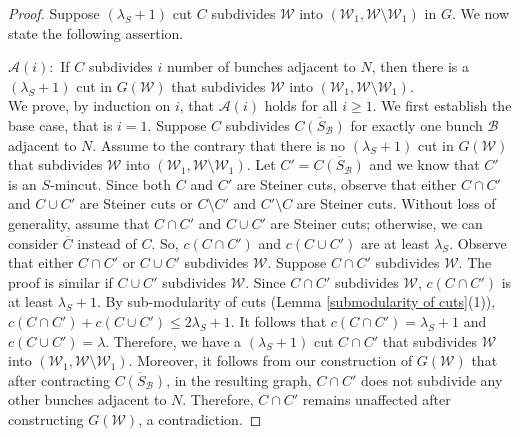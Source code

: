 \documentclass[letterpaper,11pt]{article}
\begin{document}
\begin{proof}
    Suppose $(\lambda_S+1)$ cut $C$ subdivides ${\mathcal W}$ into $({\mathcal W}_1,{\mathcal W}\setminus {\mathcal W}_1)$ in $G$. 
    We now state the following assertion.
    
    \noindent
    ${\mathcal A}(i):$ If $C$ subdivides $i$ number of bunches adjacent to $N$, then there is a $(\lambda_S+1)$ cut in $G({\mathcal W})$ that subdivides ${\mathcal W}$ into $({\mathcal W}_1,{\mathcal W}\setminus {\mathcal W}_1)$.\\
    We prove, by induction on $i$, that ${\mathcal A}(i)$ holds for all $i\ge 1$. We first establish the base case, that is $i=1$.  
    Suppose $C$ subdivides $\overline{C(S_{\mathcal B})}$ for exactly one bunch ${\mathcal B}$ adjacent to $N$.
    Assume to the contrary that there is no $(\lambda_S+1)$ cut in $G({\mathcal W})$ that subdivides ${\mathcal W}$ into $({\mathcal W}_1,{\mathcal W}\setminus {\mathcal W}_1)$.
    Let  $C'=\overline{C(S_{\mathcal B})}$ and we know that $C'$ is an $S$-mincut. Since both $C$ and $C'$ are Steiner cuts, observe that either $C\cap C'$ and $C\cup C'$ are Steiner cuts or $C\setminus C'$ and $C'\setminus C$ are Steiner cuts. Without loss of generality, assume that $C\cap C'$ and $C\cup C'$ are Steiner cuts; otherwise, we can consider $\overline{C}$ instead of $C$. So, $c(C\cap C')$ and $c(C\cup C')$ are at least $\lambda_S$. Observe that either $C\cap C'$ or $C\cup C'$ subdivides ${\mathcal W}$. Suppose $C\cap C'$ subdivides ${\mathcal W}$.  The proof is similar if $C\cup C'$ subdivides ${\mathcal W}$. Since $C\cap C'$ subdivides ${\mathcal W}$, $c(C\cap C')$ is at least $\lambda_S+1$. By sub-modularity of cuts (Lemma \ref{submodularity of cuts}(1)), $c(C\cap C')+c(C\cup C')\le 2\lambda_S+1$. It follows that $c(C\cap C')=\lambda_S+1$ and $c(C\cup C')=\lambda$. Therefore, we have a $(\lambda_S+1)$ cut $C\cap C'$ that subdivides ${\mathcal W}$ into $({\mathcal W}_1,{\mathcal W}\setminus {\mathcal W}_1)$. Moreover, it follows from our construction of $G({\mathcal W})$ that after contracting $\overline{C(S_{\mathcal B})}$, in the resulting graph, $C\cap C'$ does not subdivide any other bunches adjacent to $N$. Therefore, $C\cap C'$ remains unaffected after constructing $G({\mathcal W})$, a contradiction.
    

\end{proof}
\end{document}
